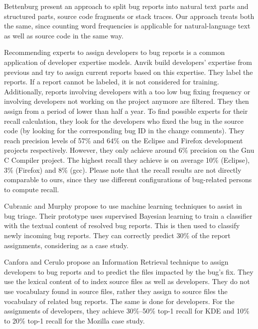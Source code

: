 Bettenburg \etal \cite{Bett08c} present an approach to split bug reports into natural text parts and structured parts, \ie source code fragments or stack traces. Our approach treats both the same, since counting word frequencies is applicable for natural-language text as well as source code in the same way.

Recommending experts to assign developers to bug reports is a common application of developer expertise models.
Anvik \etal \cite{Anvi06a} build developers' expertise from previous \BRs and try to assign current reports based on this expertise. They label the reports. If a report cannot be labeled, it is not considered for training. Additionally, reports involving developers with a too low bug fixing frequency or involving developers not working on the project anymore are filtered. They then assign \BRs from a period of lower than half a year. To find possible experts for their recall calculation, they look for the developers who fixed the bug in the source code (by looking for the corresponding bug ID in the change comments). They reach precision levels of 57\% and 64\% on the Eclipse and Firefox development projects respectively. However, they only achieve around 6\% precision on the Gnu C Compiler project. The highest recall they achieve is on average 10\% (Eclipse), 3\% (Firefox) and 8\% (gcc). Please note that the recall results are not directly comparable to ours, since they use different configurations of bug-related persons to compute recall.

Cubranic and Murphy \cite{Cubr04b} propose to use machine learning techniques to assist in bug triage. Their prototype uses supervised Bayesian learning to train a classifier with the textual content of resolved bug reports. This is then used to classify newly incoming bug reports. They can correctly predict 30\% of the report assignments, considering \EC as a case study.

Canfora and Cerulo \cite{Canf05a} propose an Information Retrieval technique to assign developers to bug reports and to predict the files impacted by the bug's fix. They use the lexical content of \BRs to index source files as well as developers. They do not use vocabulary found in source files, rather they assign to source files the vocabulary of related bug reports. The same is done for developers. For the assignments of developers, they achieve 30\%--50\% top-1 recall for KDE and 10\% to 20\% top-1 recall for the Mozilla case study.


